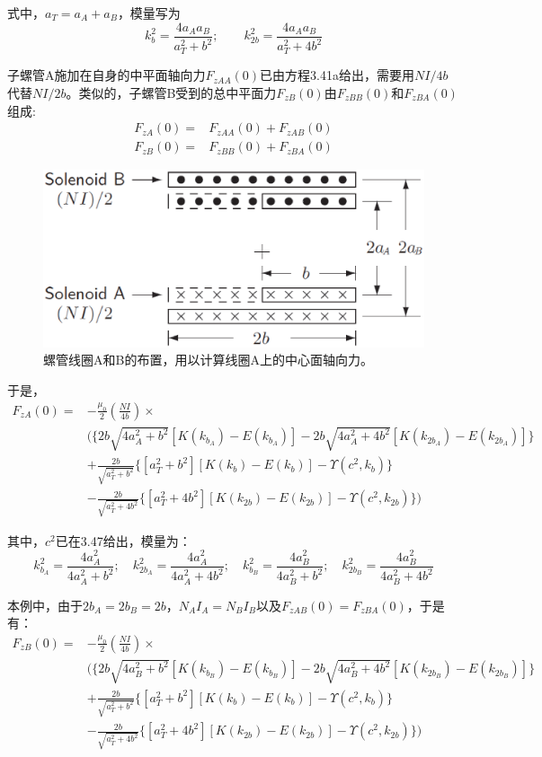 式中，$a_T=a_A+a_B$，模量写为
$$k_{b}^2=\frac{4a_A a_B}{a_T^2+b^2} ;\qquad k_{2b}^2=\frac{4a_A a_B}{a_T^2+4b^2} $$

子螺管A施加在自身的中平面轴向力$F_{zAA}(0)$已由方程3.41a给出，需要用$NI/4b$代替$NI/2b$。类似的，子螺管B受到的总中平面力$F_{zB}(0)$由$F_{zBB}(0)$和$F_{zBA}(0)$组成:
\begin{subequations}
	\begin{align}
F_{zA}(0) =& F_{zAA}(0)+F_{zAB}(0) \\
F_{zB}(0) =& F_{zBB}(0)+F_{zBA}(0)
	\end{align}
\end{subequations}

\begin{figure}[htbp]
  \centering
 \includegraphics[scale=0.4]{chpt3/figs/fig3.8.eps}
  \caption{螺管线圈A和B的布置，用以计算线圈A上的中心面轴向力。}
\end{figure}

于是，
\begin{equation}
\begin{split}
F_{zA}(0)=&-\frac{\mu_0}{2}(\frac{N I}{4b})\times \\
&( \{2b\sqrt{4a_A^2+b^2}[K(k_{b_A})-E(k_{b_A})]-2b\sqrt{4a_A^2+4b^2}[K(k_{2b_A})-E(k_{2b_A})]\}\\
&+\frac{2b}{\sqrt{a_T^2+b^2}} \{[a_T^2+b^2][K(k_{b})-E(k_{b})]-\Upsilon(c^2,k_b)\}\\
&-\frac{2b}{\sqrt{a_T^2+4b^2}} \{[a_T^2+4b^2][K(k_{2b})-E(k_{2b})]-\Upsilon(c^2,k_{2b}) \})
\end{split}
\end{equation}

其中，$c^2$已在3.47给出，模量为：
$$k_{b_A}^2=\frac{4a_A^2}{4a_A^2+b^2} ;\quad k_{2b_A}^2=\frac{4a^2_A}{4a_A^2+4b^2};\quad
k_{b_B}^2=\frac{4a_B^2}{4a_B^2+b^2} ;\quad k_{2b_B}^2=\frac{4a^2_B}{4a_B^2+4b^2} $$

本例中，由于$2b_A=2b_B=2b$，$N_A I_A=N_B I_B$以及$F_{zAB}(0)=F_{zBA}(0)$，于是有：
\begin{equation*}
\begin{split}
F_{zB}(0)=&-\frac{\mu_0}{2}(\frac{N I}{4b})\times \\
&\bigg( \{2b\sqrt{4a_B^2+b^2}[K(k_{b_B})-E(k_{b_B})]-2b\sqrt{4a_B^2+4b^2}[K(k_{2b_B})-E(k_{2b_B})]\}\\
&+\frac{2b}{\sqrt{a_T^2+b^2}} \{[a_T^2+b^2][K(k_{b})-E(k_{b})]-\Upsilon(c^2,k_b)\}\\
&-\frac{2b}{\sqrt{a_T^2+4b^2}} \{[a_T^2+4b^2][K(k_{2b})-E(k_{2b})]-\Upsilon(c^2,k_{2b}) \}\bigg)
\end{split}\tag{3.53'}
\end{equation*}

